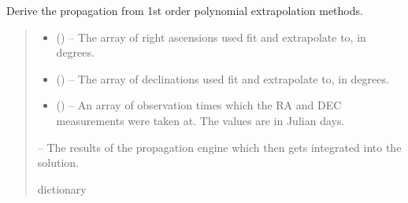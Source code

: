 \documentclass[letterpaper,11pt,english]{sphinxmanual}
\begin{document}
\begin{savenotes}\begin{fulllineitems}
\label{\detokenize{code/opihiexarata.propagate.solution:opihiexarata.propagate.solution._vehicle_linear_propagation}}
\pysigstartsignatures
{}
\pysigstopsignatures
\sphinxAtStartPar
Derive the propagation from 1st order polynomial extrapolation methods.
\begin{quote}\begin{description}
\begin{itemize}
\item {} 
\sphinxAtStartPar
{} () – The array of right ascensions used fit and extrapolate to,
in degrees.

\item {} 
\sphinxAtStartPar
{} () – The array of declinations used fit and extrapolate to, in degrees.

\item {} 
\sphinxAtStartPar
{} () – An array of observation times which the RA and DEC measurements
were taken at. The values are in Julian days.

\end{itemize}

\sphinxAtStartPar
{} – The results of the propagation engine which then gets integrated into
the solution.

\sphinxAtStartPar
dictionary

\end{description}\end{quote}

\end{fulllineitems}\end{savenotes}
\end{document}
